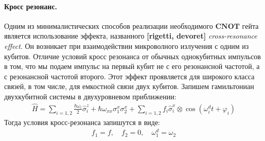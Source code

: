 \documentclass[12pt, twoside]{report}
\numberwithin{equation}{section}
\numberwithin{figure}{section}
\begin{document}
\paragraph{Кросс резонанс.} Одним из минималистических способов реализации необходимого $\mathbf{CNOT}$ гейта является использование эффекта, названного \textbf{[rigetti, devoret]} \textit{cross-resonance effect}. Он возникает при взаимодействии микроволного излучения с одним из кубитов. Отличие условий кросс резонанса от обычных однокубитных импульсов в том, что мы подаем импульс на первый кубит не с его резонансной частотой, а с резонансной частотой второго. Этот эффект проявляется для широкого класса связей, в том числе, для емкостной связи двух кубитов. Запишем гамильтониан двухкубитной системы в двухуровневом приближении:
\begin{gather*}
\hat{H} = \sum_{i = 1,2} \frac{ \hbar \omega_i }{2} \hat \sigma_i^z + \hbar \omega_{xx} \sigma^x_1 \sigma^x_2 + 
\sum_{i = 1,2} f_i  \hat{\sigma}^x_i \otimes  \cos \left( \omega^d_i t + \varphi_i \right) 
\label{eq:2qubit-ham-2d}
\end{gather*}
Тогда условия кросс-резонанса запишутся в виде:
\begin{gather}
f_1 = f, \quad f_2 = 0, \quad \omega^d_1 = \omega_2
\label{eq:cross-resonance-conditions}
\end{gather}
\end{document}
